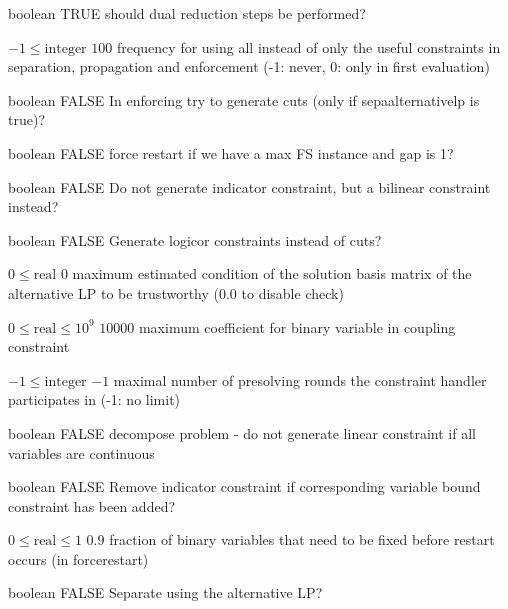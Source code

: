 %
{boolean}%
{TRUE}%
{should dual reduction steps be performed?}%
{}

%
{$-1\leq\textrm{integer}$}%
{$100$}%
{frequency for using all instead of only the useful constraints in separation, propagation and enforcement (-1: never, 0: only in first evaluation)}%
{}

%
{boolean}%
{FALSE}%
{In enforcing try to generate cuts (only if sepaalternativelp is true)?}%
{}

%
{boolean}%
{FALSE}%
{force restart if we have a max FS instance and gap is 1?}%
{}

%
{boolean}%
{FALSE}%
{Do not generate indicator constraint, but a bilinear constraint instead?}%
{}

%
{boolean}%
{FALSE}%
{Generate logicor constraints instead of cuts?}%
{}

%
{$0\leq\textrm{real}$}%
{$0$}%
{maximum estimated condition of the solution basis matrix of the alternative LP to be trustworthy (0.0 to disable check)}%
{}

%
{$0\leq\textrm{real}\leq10^{  9}$}%
{$10000$}%
{maximum coefficient for binary variable in coupling constraint}%
{}

%
{$-1\leq\textrm{integer}$}%
{$-1$}%
{maximal number of presolving rounds the constraint handler participates in (-1: no limit)}%
{}

%
{boolean}%
{FALSE}%
{decompose problem - do not generate linear constraint if all variables are continuous}%
{}

%
{boolean}%
{FALSE}%
{Remove indicator constraint if corresponding variable bound constraint has been added?}%
{}

%
{$0\leq\textrm{real}\leq1$}%
{$0.9$}%
{fraction of binary variables that need to be fixed before restart occurs (in forcerestart)}%
{}

%
{boolean}%
{FALSE}%
{Separate using the alternative LP?}%
{}


